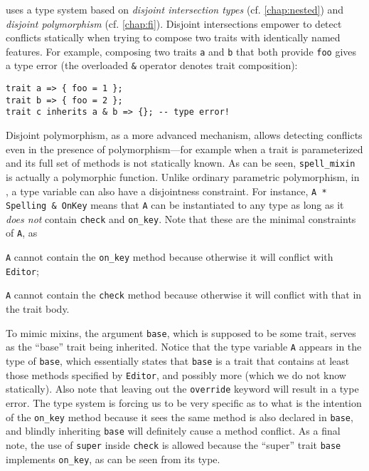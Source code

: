 \sedel uses a type system based on \emph{disjoint intersection types} (cf. \cref{chap:nested}) and
\emph{disjoint polymorphism} (cf. \cref{chap:fi}). Disjoint intersections
empower \sedel to detect conflicts statically when trying to compose two
traits with identically named features. For example, composing two traits
\lstinline{a} and \lstinline{b} that both provide \lstinline{foo} gives a
type error (the overloaded \lstinline{&} operator denotes trait composition):
\begin{lstlisting}
trait a => { foo = 1 };
trait b => { foo = 2 };
trait c inherits a & b => {}; -- type error!
\end{lstlisting}
Disjoint polymorphism, as a more advanced mechanism, allows detecting conflicts
even in the presence of polymorphism---for example when a trait is parameterized and its
full set of methods is not statically known. As can be seen,
\lstinline{spell_mixin} is actually a polymorphic function. Unlike ordinary
parametric polymorphism, in \sedel, a type variable can also have a disjointness
constraint. For instance, \lstinline{A * Spelling & OnKey}
means that \lstinline{A} can be instantiated to any type as long as it \emph{does not}
contain \lstinline{check} and \lstinline{on_key}. Note that these are the minimal constraints of \lstinline{A}, as
\begin{inparaenum}[(1)]
  \item \lstinline{A} cannot contain the \lstinline{on_key} method because otherwise it will conflict with \lstinline{Editor};
  \item \lstinline{A} cannot contain the \lstinline{check} method because otherwise it will conflict with that in the trait body.
\end{inparaenum}
To mimic mixins, the
argument \lstinline{base}, which is supposed to be some trait, serves as the
``base'' trait being inherited. Notice that the type variable
\lstinline{A} appears in the type of \lstinline{base}, which essentially states
that \lstinline{base} is a trait that contains at least those methods specified
by \lstinline{Editor}, and possibly more (which we do not know statically).
Also note that leaving out the \lstinline{override} keyword will result in a
type error. The type system is forcing us to be very specific as to what is the
intention of the \lstinline{on_key} method because it sees the same method is
also declared in \lstinline{base}, and blindly inheriting \lstinline{base}
will definitely cause a method conflict. As a final note, the use of \lstinline{super}
inside \lstinline{check} is allowed because the ``super'' trait \lstinline{base}
implements \lstinline{on_key}, as can be seen from its type.


